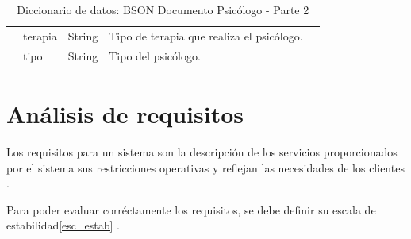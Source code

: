 \begin{table}[htpb]
\begin{tabularx}{\textwidth}{|l|X|X|X|X|}
                   & terapia                                                                                                                                                & String                                                                                                                     & Tipo de terapia que realiza el psicólogo.                                                                                                                                                                                                                                   \\ \cline{2-4} 
                   & tipo                                                                                                                                                   & String                                                                                                                     & Tipo del psicólogo.                                                                                                                                                                                                                                                         \\ \hline
\end{tabularx}
\caption{Diccionario de datos: BSON Documento Psicólogo - Parte 2}
\label{fig:dic_datos_BSON_4}
\end{table}


\section{Análisis de requisitos}


Los requisitos para un sistema son la descripción de los servicios proporcionados por el sistema sus restricciones operativas y reflejan las necesidades de los clientes \cite{sommerville}.


Para poder evaluar corréctamente los requisitos, se debe definir su escala de estabilidad\ref{esc_estab} \cite{sommerville}.


